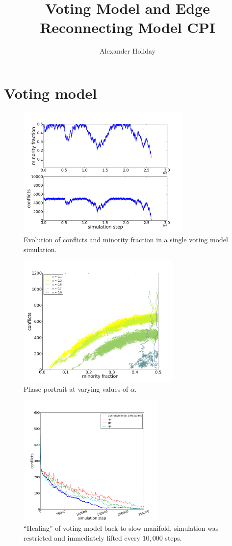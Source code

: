 \documentclass[11pt]{article}
\begin{document}
\title{\vspace{-5mm}Voting Model and Edge Reconnecting Model CPI}
\author{Alexander Holiday}
\maketitle
\section*{Voting model}
\begin{figure}
  \centering
  \includegraphics[height=65mm]{vmDynamics}
  \caption{Evolution of conflicts and minority fraction in a single voting model simulation.}
  \label{fig:vmDynamics}
\end{figure}

\begin{figure}
  \centering
  \includegraphics[height=65mm]{vmPhasePortrait}
  \caption{Phase portrait at varying values of $\alpha$.}
  \label{fig:vmPP}
\end{figure}

\begin{figure}
  \centering
  \includegraphics[height=65mm]{vmHealing}
  \caption{``Healing'' of voting model back to slow manifold, simulation was restricted and immediately lifted every $10,000$ steps.}
  \label{fig:vmHealing}
\end{figure}
\end{document}
